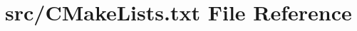 \hypertarget{CMakeLists_8txt}{}\section{src/\+C\+Make\+Lists.txt File Reference}
\label{CMakeLists_8txt}
